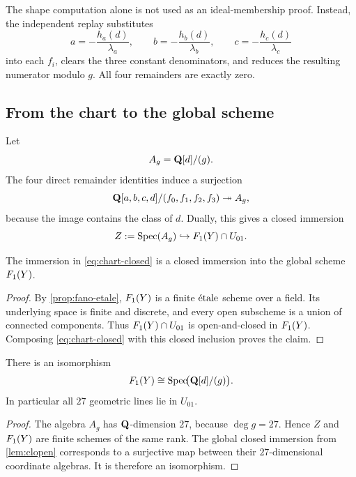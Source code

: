 The shape computation alone is not used as an ideal-membership proof.
Instead, the independent replay substitutes
\begin{equation}
 a=-\frac{h_a(d)}{\lambda_a},\qquad
 b=-\frac{h_b(d)}{\lambda_b},\qquad
 c=-\frac{h_c(d)}{\lambda_c}
\label{eq:back-substitution}
\end{equation}
into each \(f_i\), clears the three constant denominators, and reduces the
resulting numerator modulo \(g\).  All four remainders are exactly zero.

\subsection{From the chart to the global scheme}

Let
\[
 A_g=\mathbf Q[d]/(g).
\]
The four direct remainder identities induce a surjection
\begin{equation}
 \mathbf Q[a,b,c,d]/(f_0,f_1,f_2,f_3)
 \twoheadrightarrow A_g,
\label{eq:chart-surjection}
\end{equation}
because the image contains the class of \(d\).  Dually, this gives a closed
immersion
\begin{equation}
 Z:=\operatorname{Spec}(A_g)\hookrightarrow F_1(Y)\cap U_{01}.
\label{eq:chart-closed}
\end{equation}

\begin{lemma}
\label{lem:clopen}
The immersion in \cref{eq:chart-closed} is a closed immersion into the global
scheme \(F_1(Y)\).
\end{lemma}

\begin{proof}
By \cref{prop:fano-etale}, \(F_1(Y)\) is a finite \(\mathrm{\acute{e}tale}\) scheme over a
field.  Its underlying space is finite and discrete, and every open
subscheme is a union of connected components.  Thus
\(F_1(Y)\cap U_{01}\) is open-and-closed in \(F_1(Y)\).  Composing
\cref{eq:chart-closed} with this closed inclusion proves the claim.
\end{proof}

\begin{proposition}
\label{prop:complete-chart}
There is an isomorphism
\[
  F_1(Y)\cong\operatorname{Spec}\!\bigl(\mathbf Q[d]/(g)\bigr).
\]
In particular all \(27\) geometric lines lie in \(U_{01}\).
\end{proposition}

\begin{proof}
The algebra \(A_g\) has \(\mathbf Q\)-dimension \(27\), because
\(\deg g=27\).  Hence \(Z\) and \(F_1(Y)\) are finite schemes of the same
rank.  The global closed immersion from \cref{lem:clopen} corresponds to a
surjective map between their \(27\)-dimensional coordinate algebras.  It is
therefore an isomorphism.
\end{proof}

